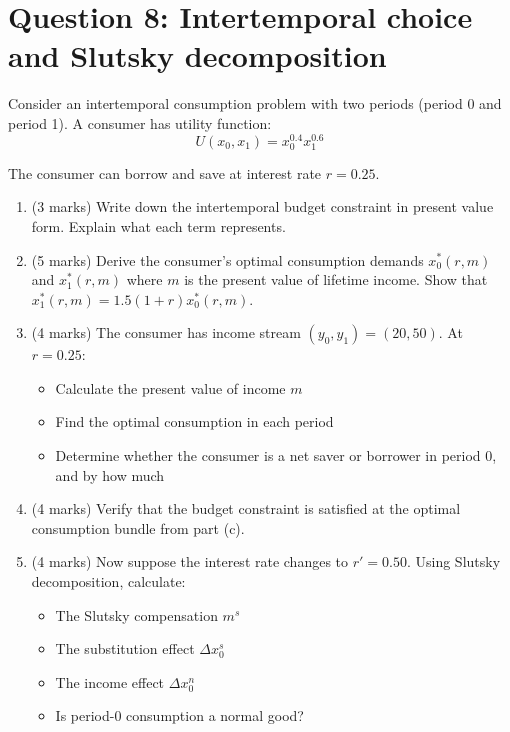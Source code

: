 \documentclass[12pt]{article}
\begin{document}
\newpage
\section*{Question 8: Intertemporal choice and Slutsky decomposition}

Consider an intertemporal consumption problem with two periods (period 0 and period 1). A consumer has utility function:
\[
U(x_0, x_1) = x_0^{0.4} x_1^{0.6}
\]

The consumer can borrow and save at interest rate $r = 0.25$.

\begin{enumerate}[label=(\alph*)]
\item (3 marks) Write down the intertemporal budget constraint in present value form. Explain what each term represents.

\item (5 marks) Derive the consumer's optimal consumption demands $x_0^*(r, m)$ and $x_1^*(r, m)$ where $m$ is the present value of lifetime income. Show that $x_1^*(r, m) = 1.5(1+r) x_0^*(r, m)$.

\item (4 marks) The consumer has income stream $(y_0, y_1) = (20, 50)$. At $r = 0.25$:
\begin{itemize}
\item Calculate the present value of income $m$
\item Find the optimal consumption in each period
\item Determine whether the consumer is a net saver or borrower in period 0, and by how much
\end{itemize}

\item (4 marks) Verify that the budget constraint is satisfied at the optimal consumption bundle from part (c).

\item (4 marks) Now suppose the interest rate changes to $r' = 0.50$. Using Slutsky decomposition, calculate:
\begin{itemize}
\item The Slutsky compensation $m^s$
\item The substitution effect $\Delta x_0^s$
\item The income effect $\Delta x_0^n$
\item Is period-0 consumption a normal good?
\end{itemize}
\end{enumerate}
\end{document}
